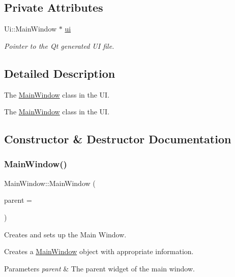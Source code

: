 \subsection*{Private Attributes}
\begin{DoxyCompactItemize}
\item 
Ui\+::\+Main\+Window $\ast$ \hyperlink{class_main_window_a35466a70ed47252a0191168126a352a5}{ui}
\begin{DoxyCompactList}\small\item\em Pointer to the Qt generated UI file. \end{DoxyCompactList}\end{DoxyCompactItemize}


\subsection{Detailed Description}
The \hyperlink{class_main_window}{Main\+Window} class in the UI. 

The \hyperlink{class_main_window}{Main\+Window} class in the UI. 

\subsection{Constructor \& Destructor Documentation}
\mbox{\label{class_main_window_a8b244be8b7b7db1b08de2a2acb9409db}} 
\subsubsection{\texorpdfstring{Main\+Window()}{MainWindow()}}
{\footnotesize\ttfamily Main\+Window\+::\+Main\+Window (\begin{DoxyParamCaption}\item[{Q\+Widget $\ast$}]{parent = {} }\end{DoxyParamCaption})\hspace{0.3cm}{\ttfamily [explicit]}}



Creates and sets up the Main Window. 

Creates a \hyperlink{class_main_window}{Main\+Window} object with appropriate information. 
\begin{DoxyParams}{Parameters}
{\em parent} & The parent widget of the main window. \\
\hline
\end{DoxyParams}
\mbox{\label{class_main_window_ae98d00a93bc118200eeef9f9bba1dba7}} 
